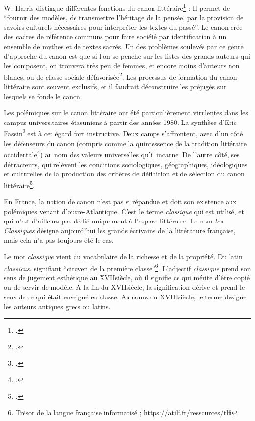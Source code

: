 W. Harris distingue différentes fonctions du canon littéraire\footcites{harris_canonicity_1991} : Il permet de \enquote{fournir des modèles, de transmettre l'héritage de la pensée, par la provision de savoirs culturels nécessaires pour interpréter les textes du passé}. Le canon crée des cadres de référence communs pour faire société par identification à un ensemble de mythes et de textes sacrés. Un des problèmes soulevés par ce genre d'approche du canon est que si l'on se penche sur les listes des grands auteurs qui les composent, on trouvera très peu de femmes, et encore moins d'auteurs non blancs, ou de classe sociale défavorisée\footcites{guillory_cultural_1998}. Les processus de formation du canon littéraire sont souvent exclusifs, et il faudrait déconstruire les préjugés sur lesquels se fonde le canon.

Les polémiques sur le canon littéraire ont été particulièrement virulentes dans les campus universitaires étasuniens à partir des années 1980. La synthèse d'Eric Fassin\footcites{fassin_chaire_1993} est à cet égard fort instructive. Deux camps s'affrontent, avec d'un côté les défenseurs du canon (compris comme la quintessence de la tradition littéraire occidentale\footcites{bloom_western_1994}) au nom des valeurs universelles qu'il incarne. De l'autre côté, ses détracteurs, qui relèvent les conditions sociologiques, géographiques, idéologiques et culturelles de la production des critères de définition et de sélection du canon littéraire\footcites{harder_deconstruire_2013}. 

En France, la notion de canon n'est pas si répandue et doit son existence aux polémiques venant d'outre-Atlantique. C'est le terme \textit{classique} qui est utilisé, et qui n'est d'ailleurs pas dédié uniquement à l'espace littéraire. Le nom \textit{les Classiques} désigne aujourd'hui les grands écrivains de la littérature française, mais cela n'a pas toujours été le cas.

Le mot \textit{classique} vient du vocabulaire de la richesse et de la propriété. Du latin \textit{classicus}, signifiant \enquote{citoyen de la première classe}\footnote{Trésor de la langue française informatisé ; https://atilf.fr/ressources/tlfi}. L'adjectif \textit{classique} prend son sens de jugement esthétique au XVII\ieme siècle, où il signifie ce qui mérite d'être copié ou de servir de modèle. A la fin du XVII\ieme siècle, la signification dérive et prend le sens de ce qui était enseigné en classe. Au cours du XVIII\ieme siècle, le terme désigne les auteurs antiques grecs ou latins. 

